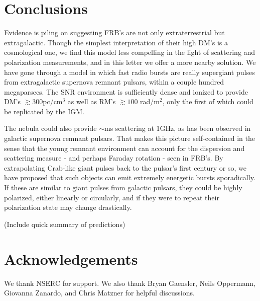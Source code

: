 \documentclass[useAMS,usenatbib]{emulateapj}
\begin{document}

\section{Conclusions}
Evidence is piling on suggesting FRB's are not only extraterrestrial
but extragalactic. Though the simplest interpretation of their high DM's 
is a cosmological one, we find this model less compelling in the light of 
scattering and polarization measurements, and in this letter we offer a 
more nearby solution. We have gone through
a model in which fast radio bursts are really supergiant pulses from 
extragalactic supernova remnant pulsars, within a couple hundred megaparsecs. 
The SNR environment is sufficiently
dense and ionized to provide DM's $\gtrsim 300$pc/cm$^3$ as well as 
RM's $\gtrsim 100$ rad/m$^2$, only the first of which could be replicated by the IGM. 

The nebula could also provide $\sim$ms scattering at 1GHz, as has been 
observed in galactic supernova remnant pulsars. 
That makes this picture self-contained in the sense that
the young remnant environment can account for the dispersion 
and scattering measure - and perhaps Faraday rotation - seen in FRB's. 
By extrapolating Crab-like giant pulses back to the pulsar's first century or so,
we have proposed that such objects can emit extremely energetic bursts sporadically. 
If these are similar to giant pulses from galactic pulsars, they could be highly polarized, 
either linearly or circularly, and if they were to repeat their polarization state may 
change drastically. 

(Include quick summary of predictions)

\section{Acknowledgements}

We thank NSERC for support. We also thank Bryan Gaensler, Neils Oppermann, 
Giovanna Zanardo, and Chris Matzner for helpful discussions. 

%




\label{lastpage}
\end{document}

